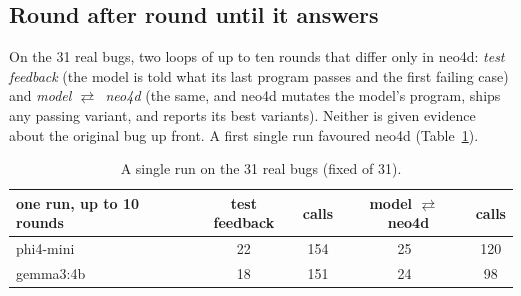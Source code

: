 \documentclass[10pt]{article}
\newcommand{\ra}{\ensuremath{\rightleftarrows}}
\begin{document}
\subsection{Round after round until it answers}
\label{sec:loop}
On the 31 real bugs, two loops of up to ten rounds that differ only in neo4d: \emph{test feedback} (the model is told
what its last program passes and the first failing case) and \emph{model \ra\ neo4d} (the same, and neo4d mutates the
model's program, ships any passing variant, and reports its best variants). Neither is given evidence about the
original bug up front. A first single run favoured neo4d (Table~\ref{tab:loop}).
\begin{table}[H]
\centering\small
\begin{tabular}{lcccc}
\toprule
one run, up to 10 rounds & test feedback & calls & model \ra\ neo4d & calls\\
\midrule
phi4-mini & 22 & 154 & 25 & 120\\
gemma3:4b & 18 & 151 & 24 & 98\\
\bottomrule
\end{tabular}
\caption{A single run on the 31 real bugs (fixed of 31).}
\label{tab:loop}
\end{table}
\end{document}
